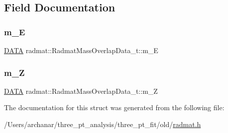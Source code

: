 \subsection{Field Documentation}
\mbox{\label{structradmat_1_1RadmatMassOverlapData__t_a3320a8f40f6721b4c404af41a9508886}} 
\subsubsection{\texorpdfstring{m\_E}{m\_E}}
{\footnotesize\ttfamily \mbox{\hyperlink{structradmat_1_1RadmatMassOverlapData__t_ab3de1245b76e79f9867e3af00989e5b6}{D\+A\+TA}} radmat\+::\+Radmat\+Mass\+Overlap\+Data\+\_\+t\+::m\+\_\+E}

\mbox{\label{structradmat_1_1RadmatMassOverlapData__t_ad626db20e01f0d55e0fd230094273066}} 
\subsubsection{\texorpdfstring{m\_Z}{m\_Z}}
{\footnotesize\ttfamily \mbox{\hyperlink{structradmat_1_1RadmatMassOverlapData__t_ab3de1245b76e79f9867e3af00989e5b6}{D\+A\+TA}} radmat\+::\+Radmat\+Mass\+Overlap\+Data\+\_\+t\+::m\+\_\+Z}



The documentation for this struct was generated from the following file\+:\begin{DoxyCompactItemize}
\item 
/\+Users/archanar/three\+\_\+pt\+\_\+analysis/three\+\_\+pt\+\_\+fit/old/\mbox{\hyperlink{radmat_8h}{radmat.\+h}}\end{DoxyCompactItemize}
